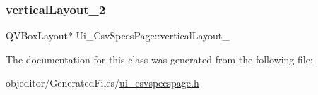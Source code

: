 \mbox{\label{class_ui___csv_specs_page_aa903c10890417377a15bef538f6fc8bc}} 
\subsubsection{\texorpdfstring{verticalLayout\_2}{verticalLayout\_2}}
{\footnotesize\ttfamily Q\+V\+Box\+Layout$\ast$ Ui\+\_\+\+Csv\+Specs\+Page\+::vertical\+Layout\+\_}



The documentation for this class was generated from the following file\+:\begin{DoxyCompactItemize}
\item 
objeditor/\+Generated\+Files/\mbox{\hyperlink{ui__csvspecspage_8h}{ui\+\_\+csvspecspage.\+h}}\end{DoxyCompactItemize}

